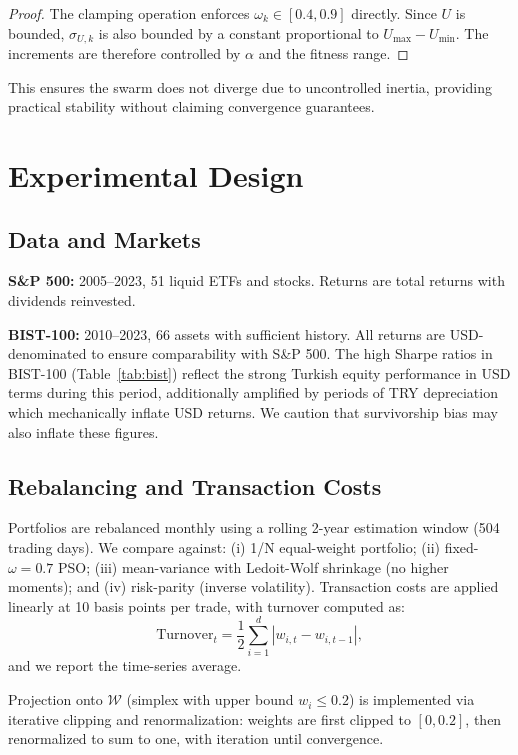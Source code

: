 \documentclass[12pt,a4paper]{article}
\begin{document}
	\begin{proof}
		The clamping operation enforces $\omega_k\in[0.4,0.9]$ directly. Since $U$ is bounded, $\sigma_{U,k}$ is also bounded by a constant proportional to $U_{\max}-U_{\min}$. The increments are therefore controlled by $\alpha$ and the fitness range.
	\end{proof}
	
	This ensures the swarm does not diverge due to uncontrolled inertia, providing practical stability without claiming convergence guarantees.
	
	\section{Experimental Design}
	
	\subsection{Data and Markets}
	
	\textbf{S\&P 500:} 2005--2023, 51 liquid ETFs and stocks. Returns are total returns with dividends reinvested.
	
	\textbf{BIST-100:} 2010--2023, 66 assets with sufficient history. All returns are USD-denominated to ensure comparability with S\&P 500. The high Sharpe ratios in BIST-100 (Table~\ref{tab:bist}) reflect the strong Turkish equity performance in USD terms during this period, additionally amplified by periods of TRY depreciation which mechanically inflate USD returns. We caution that survivorship bias may also inflate these figures.
	
	\subsection{Rebalancing and Transaction Costs}
	
	Portfolios are rebalanced monthly using a rolling 2-year estimation window (504 trading days). We compare against: (i) 1/N equal-weight portfolio; (ii) fixed-$\omega=0.7$ PSO; (iii) mean-variance with Ledoit-Wolf shrinkage (no higher moments); and (iv) risk-parity (inverse volatility). Transaction costs are applied linearly at 10 basis points per trade, with turnover computed as:
	\begin{equation}
	\text{Turnover}_t = \frac{1}{2}\sum_{i=1}^d |w_{i,t} - w_{i,t-1}|,
	\end{equation}
	and we report the time-series average.
	
	Projection onto $\mathcal{W}$ (simplex with upper bound $w_i \le 0.2$) is implemented via iterative clipping and renormalization: weights are first clipped to $[0, 0.2]$, then renormalized to sum to one, with iteration until convergence.
	
\end{document}
